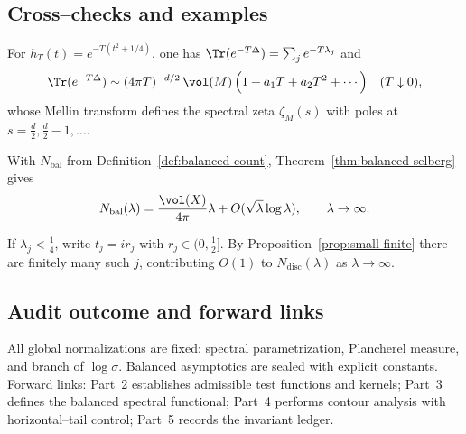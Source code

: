 \subsection{Cross–checks and examples}\relax \hspace{0pt}
\label{subsec:examples-part1}
\begin{example}\relax
For $h_T(t)=e^{-T(t^2+1/4)}$, one has $\Tr(e^{-T\Delta})=\sum_j e^{-T\lambda_j}$ and
\[
  \Tr(e^{-T\Delta})\sim (4\pi T)^{-d/2}\,\vol(M)\,\Big(1+a_1T+a_2T^2+\cdots\Big)\quad (T\downarrow 0),
\]
whose Mellin transform defines the spectral zeta $\zeta_M(s)$ with poles at $s=\tfrac d2,\tfrac d2-1,\dots$. %
\end{example}

\begin{example}\relax
With $N_{\mathrm{bal}}$ from Definition~\ref{def:balanced-count}, Theorem~\ref{thm:balanced-selberg} gives
\[
  N_{\mathrm{bal}}(\lambda)=\frac{\vol(X)}{4\pi}\lambda+O(\sqrt{\lambda}\log\lambda),\qquad \lambda\to\infty.
\]
\end{example}

\begin{example}\relax
If $\lambda_j<\tfrac14$, write $t_j=ir_j$ with $r_j\in(0,\tfrac12]$. By Proposition~\ref{prop:small-finite} there are finitely many such $j$, contributing $O(1)$ to $N_{\mathrm{disc}}(\lambda)$ as $\lambda\to\infty$. %
\end{example}

\subsection{Audit outcome and forward links}\relax \hspace{0pt}
\label{subsec:audit-forward-part1}
\noindent
All global normalizations are fixed: spectral parametrization, Plancherel measure, and branch of $\log\sigma$. 
Balanced asymptotics are sealed with explicit constants. 
Forward links: Part~2 establishes admissible test functions and kernels; Part~3 defines the balanced spectral functional; Part~4 performs contour analysis with horizontal–tail control; Part~5 records the invariant ledger. %

